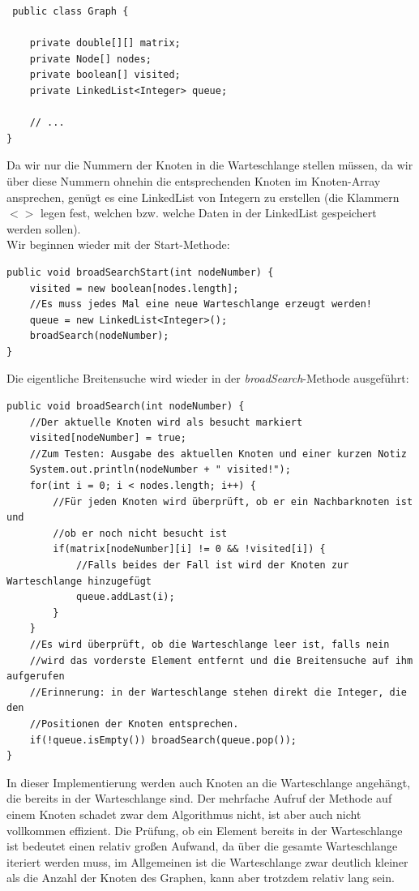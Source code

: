 \documentclass{article}
\begin{document}
\begin{verbatim}
 public class Graph {

    private double[][] matrix;
    private Node[] nodes;
    private boolean[] visited;
    private LinkedList<Integer> queue;

    // ...
}
\end{verbatim}
Da wir nur die Nummern der Knoten in die Warteschlange stellen müssen, da wir über diese Nummern ohnehin die entsprechenden Knoten im Knoten-Array ansprechen, genügt es eine LinkedList von Integern zu erstellen (die Klammern $<>$ legen fest, welchen  bzw. welche Daten in der LinkedList gespeichert werden sollen). \\
Wir beginnen wieder mit der Start-Methode:
\begin{verbatim}
public void broadSearchStart(int nodeNumber) {
    visited = new boolean[nodes.length];
    //Es muss jedes Mal eine neue Warteschlange erzeugt werden!
    queue = new LinkedList<Integer>();
    broadSearch(nodeNumber);
}
\end{verbatim}
Die eigentliche Breitensuche wird wieder in der \textit{broadSearch}-Methode ausgeführt:
\begin{verbatim}
public void broadSearch(int nodeNumber) {
    //Der aktuelle Knoten wird als besucht markiert
    visited[nodeNumber] = true;
    //Zum Testen: Ausgabe des aktuellen Knoten und einer kurzen Notiz
    System.out.println(nodeNumber + " visited!");
    for(int i = 0; i < nodes.length; i++) {
        //Für jeden Knoten wird überprüft, ob er ein Nachbarknoten ist und
        //ob er noch nicht besucht ist
        if(matrix[nodeNumber][i] != 0 && !visited[i]) {
            //Falls beides der Fall ist wird der Knoten zur Warteschlange hinzugefügt
            queue.addLast(i);
        }
    }
    //Es wird überprüft, ob die Warteschlange leer ist, falls nein
    //wird das vorderste Element entfernt und die Breitensuche auf ihm aufgerufen
    //Erinnerung: in der Warteschlange stehen direkt die Integer, die den
    //Positionen der Knoten entsprechen.
    if(!queue.isEmpty()) broadSearch(queue.pop());
}
\end{verbatim}
In dieser Implementierung werden auch Knoten an die Warteschlange angehängt, die bereits in der Warteschlange sind. Der mehrfache Aufruf der Methode auf einem Knoten schadet zwar dem Algorithmus nicht, ist aber auch nicht vollkommen effizient. Die Prüfung, ob ein Element bereits in der Warteschlange ist bedeutet einen relativ großen Aufwand, da über die gesamte Warteschlange iteriert werden muss, im Allgemeinen ist die Warteschlange zwar deutlich kleiner als die Anzahl der Knoten des Graphen, kann aber trotzdem relativ lang sein. \\
\end{document}

